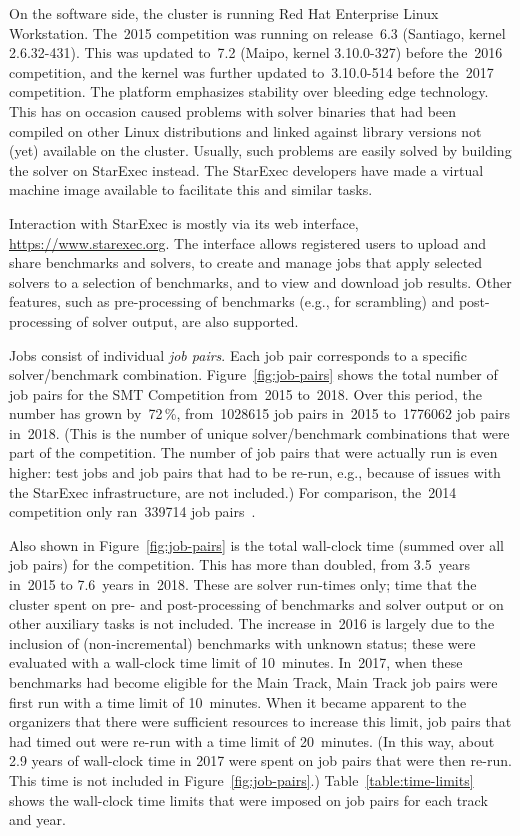 \documentclass[dvipsnames,table,twoside,11pt]{article}
\newcommand{\maintrack}{Main Track\xspace}
\begin{document}
On the software side, the cluster is running Red Hat Enterprise Linux
Workstation.  The~2015 competition was running on release~6.3
(Santiago, kernel 2.6.32-431).  This was updated to~7.2 (Maipo, kernel
3.10.0-327) before the~2016 competition, and the kernel was further
updated to~3.10.0-514 before the~2017 competition.  The platform
emphasizes stability over bleeding edge technology.  This has on
occasion caused problems with solver binaries that had been compiled
on other Linux distributions and linked against library versions not
(yet) available on the cluster.  Usually, such problems are easily
solved by building the solver on StarExec instead.  The StarExec
developers have made a virtual machine image available to facilitate
this and similar tasks.

Interaction with StarExec is mostly via its web interface,
\url{https://www.starexec.org}.  The interface allows registered users
to upload and share benchmarks and solvers, to create and manage jobs
that apply selected solvers to a selection of benchmarks, and to view
and download job results.  Other features, such as pre-processing of
benchmarks (e.g., for scrambling) and post-processing of solver
output, are also supported.

Jobs consist of individual \emph{job pairs}.  Each job pair
corresponds to a specific solver/benchmark combination.
Figure~\ref{fig:job-pairs} shows the total number of job pairs for the
SMT Competition from~2015 to~2018.  Over this period, the number has
grown by~72\,\%, from~\num{1028615} job pairs in~2015 to~\num{1776062} job
pairs in~2018.  (This is the number of unique solver/benchmark
combinations that were part of the competition.  The number of job
pairs that were actually run is even higher: test jobs and job pairs
that had to be re-run, e.g., because of issues with the StarExec
infrastructure, are not included.)  For comparison, the~2014
competition only ran~\num{339714} job pairs~\cite{CDW14}.

Also shown in Figure~\ref{fig:job-pairs} is the total wall-clock time
(summed over all job pairs) for the competition.  This has more than
doubled, from 3.5~years in~2015 to 7.6~years in~2018.  These are
solver run-times only; time that the cluster spent on pre- and
post-processing of benchmarks and solver output or on other auxiliary
tasks is not included.  The increase in~2016 is largely due to the
inclusion of (non-incremental) benchmarks with unknown status; these
were evaluated with a wall-clock time limit of 10~minutes.  In~2017,
when these benchmarks had become eligible for the \maintrack,
\maintrack job pairs were first run with a time limit of 10~minutes.
When it became apparent to the organizers that there were sufficient
resources to increase this limit, job pairs that had timed out were
re-run with a time limit of 20~minutes.  (In this way, about 2.9 years
of wall-clock time in 2017 were spent on job pairs that were then
re-run.  This time is not included in Figure~\ref{fig:job-pairs}.)
Table~\ref{table:time-limits} shows the wall-clock time limits that
were imposed on job pairs for each track and year.
\end{document}
